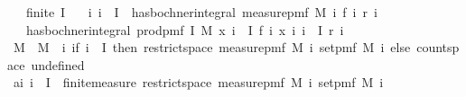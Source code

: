 \begin{isabellebody}
\ \ \ {\isachardoublequoteopen}finite\ I{\isachardoublequoteclose}\isanewline
\ \ \ {\isachardoublequoteopen}{\isasymAnd}i{\isachardot}{\kern0pt}\ i\ {\isasymin}\ I\ {\isasymLongrightarrow}\ has{\isacharunderscore}{\kern0pt}bochner{\isacharunderscore}{\kern0pt}integral\ {\isacharparenleft}{\kern0pt}measure{\isacharunderscore}{\kern0pt}pmf\ {\isacharparenleft}{\kern0pt}M\ i{\isacharparenright}{\kern0pt}{\isacharparenright}{\kern0pt}\ {\isacharparenleft}{\kern0pt}f\ i{\isacharparenright}{\kern0pt}\ {\isacharparenleft}{\kern0pt}r\ i{\isacharparenright}{\kern0pt}{\isachardoublequoteclose}\isanewline
\ \ \ {\isachardoublequoteopen}has{\isacharunderscore}{\kern0pt}bochner{\isacharunderscore}{\kern0pt}integral\ {\isacharparenleft}{\kern0pt}prod{\isacharunderscore}{\kern0pt}pmf\ I\ M{\isacharparenright}{\kern0pt}\ {\isacharparenleft}{\kern0pt}{\isasymlambda}x{\isachardot}{\kern0pt}\ {\isacharparenleft}{\kern0pt}{\isasymProd}i\ {\isasymin}\ I{\isachardot}{\kern0pt}\ f\ i\ {\isacharparenleft}{\kern0pt}x\ i{\isacharparenright}{\kern0pt}{\isacharparenright}{\kern0pt}{\isacharparenright}{\kern0pt}\ {\isacharparenleft}{\kern0pt}{\isasymProd}i\ {\isasymin}\ I{\isachardot}{\kern0pt}\ r\ i{\isacharparenright}{\kern0pt}{\isachardoublequoteclose}\isanewline
%
\isadelimproof
%
\endisadelimproof
%
\isatagproof
{}\isamarkupfalse%
\ {\isacharminus}{\kern0pt}\isanewline
\ \ \isamarkupfalse%
\ M{\isacharprime}{\kern0pt}\ \ {\isachardoublequoteopen}M{\isacharprime}{\kern0pt}\ {\isacharequal}{\kern0pt}\ {\isacharparenleft}{\kern0pt}{\isasymlambda}i{\isachardot}{\kern0pt}\ if\ i\ {\isasymin}\ I\ then\ restrict{\isacharunderscore}{\kern0pt}space\ {\isacharparenleft}{\kern0pt}measure{\isacharunderscore}{\kern0pt}pmf\ {\isacharparenleft}{\kern0pt}M\ i{\isacharparenright}{\kern0pt}{\isacharparenright}{\kern0pt}\ {\isacharparenleft}{\kern0pt}set{\isacharunderscore}{\kern0pt}pmf\ {\isacharparenleft}{\kern0pt}M\ i{\isacharparenright}{\kern0pt}{\isacharparenright}{\kern0pt}\ else\ count{\isacharunderscore}{\kern0pt}space\ {\isacharbraceleft}{\kern0pt}undefined{\isacharbraceright}{\kern0pt}{\isacharparenright}{\kern0pt}{\isachardoublequoteclose}\isanewline
\isanewline
\ \ \isamarkupfalse%
\ a{\isacharcolon}{\kern0pt}{\isachardoublequoteopen}{\isasymAnd}i{\isachardot}{\kern0pt}\ i\ {\isasymin}\ I\ {\isasymLongrightarrow}\ finite{\isacharunderscore}{\kern0pt}measure\ {\isacharparenleft}{\kern0pt}restrict{\isacharunderscore}{\kern0pt}space\ {\isacharparenleft}{\kern0pt}measure{\isacharunderscore}{\kern0pt}pmf\ {\isacharparenleft}{\kern0pt}M\ i{\isacharparenright}{\kern0pt}{\isacharparenright}{\kern0pt}\ {\isacharparenleft}{\kern0pt}set{\isacharunderscore}{\kern0pt}pmf\ {\isacharparenleft}{\kern0pt}M\ i{\isacharparenright}{\kern0pt}{\isacharparenright}{\kern0pt}{\isacharparenright}{\kern0pt}{\isachardoublequoteclose}\isanewline

\end{isabellebody}
